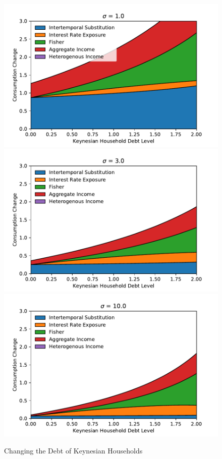 \documentclass[titlepage]{\econtex}\newcommand{\texname}{ConsumptionHeterogeneity}
\begin{document}
\begin{figure} 
	\begin{centering}
		\includegraphics[scale=0.55]{../Python/DoloCode/Figures/KeynesianDebt_sigma1_sw.pdf}
		\includegraphics[scale=0.55]{../Python/DoloCode/Figures/KeynesianDebt_sigma3_sw.pdf}
		\includegraphics[scale=0.55]{../Python/DoloCode/Figures/KeynesianDebt_sigma10_sw.pdf}
		\caption{Changing the Debt of Keynesian Households}
		\label{fig:KeynesianDebt_sw}
	\end{centering}
\end{figure}
\end{document}
